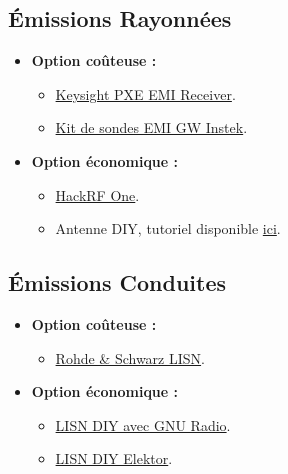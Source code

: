 \documentclass[a4paper,12pt]{article}
\begin{document}
\subsection{Émissions Rayonnées}
\begin{itemize}
    \item \textbf{Option coûteuse :}
          \begin{itemize}
              \item \href{https://www.keysight.com/us/en/product/N9048B/pxe-emi-receiver-1-hz-44-ghz.html}{Keysight PXE EMI Receiver}.
              \item \href{https://eleshop.fr/gw-instek-gkt-008-emi-probe-kit.html}{Kit de sondes EMI GW Instek}.
          \end{itemize}
    \item \textbf{Option économique :}
          \begin{itemize}
              \item \href{https://greatscottgadgets.com/hackrf/one/}{HackRF One}.
              \item Antenne DIY, tutoriel disponible \href{https://www.youtube.com/watch?v=2xy3Hm1_ZqI}{ici}.
          \end{itemize}
\end{itemize}

\subsection{Émissions Conduites}
\begin{itemize}
    \item \textbf{Option coûteuse :}
          \begin{itemize}
              \item \href{https://www.rohde-schwarz.com/fr/produits/test-et-mesure/tests-conduits/rs-hm6050-two-line-v-network-lisn_63493-48135.html}{Rohde \& Schwarz LISN}.
          \end{itemize}
    \item \textbf{Option économique :}
          \begin{itemize}
              \item \href{https://hackaday.io/project/181265-diy-cispr-25-lisn}{LISN DIY avec GNU Radio}.
              \item \href{https://www.elektor.fr/products/elektor-dual-dc-lisn-150-khz-200-mhz#section-info}{LISN DIY Elektor}.
          \end{itemize}
\end{itemize}
\end{document}
